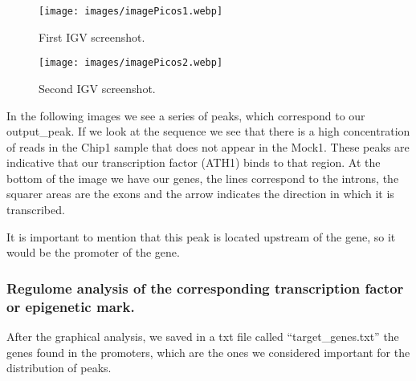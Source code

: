 \documentclass[
]{article}
\newenvironment{Shaded}{\begin{snugshade}}{\end{snugshade}}
\newcommand{\FunctionTok}[1]{\textcolor[rgb]{0.13,0.29,0.53}{\textbf{#1}}}
\newcommand{\NormalTok}[1]{#1}
\newcommand{\OtherTok}[1]{\textcolor[rgb]{0.56,0.35,0.01}{#1}}
\newcommand{\SpecialCharTok}[1]{\textcolor[rgb]{0.81,0.36,0.00}{\textbf{#1}}}
\newcommand{\StringTok}[1]{\textcolor[rgb]{0.31,0.60,0.02}{#1}}
\begin{document}
\begin{figure}
\centering
\texttt{[image: images/imagePicos1.webp]}
\caption{First IGV screenshot.}
\end{figure}

\begin{figure}
\centering
\texttt{[image: images/imagePicos2.webp]}
\caption{Second IGV screenshot.}
\end{figure}

In the following images we see a series of peaks, which correspond to
our output\_peak. If we look at the sequence we see that there is a high
concentration of reads in the Chip1 sample that does not appear in the
Mock1. These peaks are indicative that our transcription factor (ATH1)
binds to that region. At the bottom of the image we have our genes, the
lines correspond to the introns, the squarer areas are the exons and the
arrow indicates the direction in which it is transcribed.

It is important to mention that this peak is located upstream of the
gene, so it would be the promoter of the gene.

\hypertarget{regulome-analysis-of-the-corresponding-transcription-factor-or-epigenetic-mark.}{%
\subsubsection{Regulome analysis of the corresponding transcription
factor or epigenetic
mark.}\label{regulome-analysis-of-the-corresponding-transcription-factor-or-epigenetic-mark.}}

After the graphical analysis, we saved in a txt file called
``target\_genes.txt'' the genes found in the promoters, which are the
ones we considered important for the distribution of peaks.

\begin{Shaded}
\end{Shaded}
\end{document}
